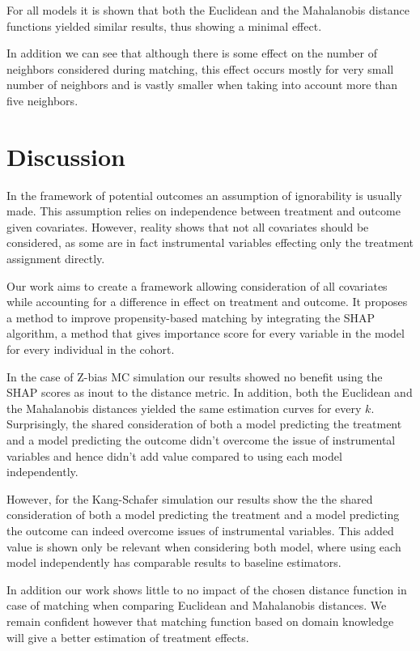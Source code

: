 \documentclass{article}
\begin{document}
For all models it is shown that both the Euclidean and the Mahalanobis distance functions yielded similar results, thus showing a minimal effect. 

In addition we can see that although there is some effect on the number of neighbors considered during matching, this effect occurs mostly for very small number of neighbors and is vastly smaller when taking into account more than five neighbors. 

\section{Discussion}
In the framework of potential outcomes an assumption of ignorability is usually made. This assumption relies on independence between treatment and outcome given covariates. However, reality shows that not all covariates should be considered, as some are in fact instrumental variables effecting only the treatment assignment directly. 

Our work aims to create a framework allowing consideration of all covariates while accounting for a difference in effect on treatment and outcome. It proposes a method to improve propensity-based matching by integrating the SHAP algorithm, a method that gives importance score for every variable in the model for every individual in the cohort.  

In the case of Z-bias MC simulation our results showed no benefit using the SHAP scores as inout to the distance metric. In addition, both the Euclidean and the Mahalanobis distances yielded the same estimation curves for every $k$. Surprisingly, the shared consideration of both a model predicting the treatment and a model predicting the outcome didn't overcome the issue of instrumental variables and hence didn't add value compared to using each model independently.

However, for the Kang-Schafer simulation our results show the the shared consideration of both a model predicting the treatment and a model predicting the outcome can indeed overcome issues of instrumental variables. This added value is shown only be relevant when considering both model, where using each model independently has comparable results to baseline estimators.

In addition our work shows little to no impact of the chosen distance function in case of matching when comparing Euclidean and Mahalanobis distances. We remain confident however that matching function based on domain knowledge will give a better estimation of treatment effects. 
\end{document}

